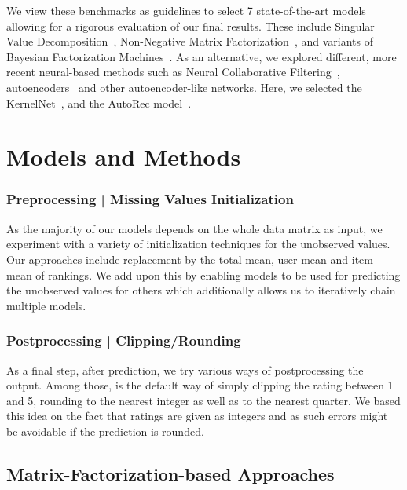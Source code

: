 \documentclass[10pt,conference,compsocconf]{IEEEtran}
\begin{document}
    We view these benchmarks as guidelines to select 7 state-of-the-art models allowing for a rigorous evaluation of our final results.
    These include Singular Value Decomposition~\cite{svd}, Non-Negative Matrix Factorization~\cite{6165290}, and variants of Bayesian Factorization Machines~\cite{freudenthaler_bayesian_2011, salakhutdinov_bayesian_2008}.
    As an alternative, we explored different, more recent neural-based methods such as Neural Collaborative Filtering~\cite{DBLP:journals/corr/abs-1708-05031}, autoencoders~\cite{inproceedings} and other autoencoder-like networks.
    Here, we selected the KernelNet~\cite{pmlr-v80-muller18a}, and the AutoRec model~\cite{inproceedings}.


    \section{Models and Methods}

    \subsubsection{Preprocessing | Missing Values Initialization}\label{subsub:missing_init}
    As the majority of our models depends on the whole data matrix as input, we experiment with a variety of initialization techniques for the unobserved values.
    Our approaches include replacement by the total mean, user mean and item mean of rankings.
    We add upon this by enabling models to be used for predicting the unobserved values for others which additionally allows us to iteratively chain multiple models.

    \subsubsection{Postprocessing | Clipping/Rounding}
    As a final step, after prediction, we try various ways of postprocessing the output.
    Among those, is the default way of simply clipping the rating between 1 and 5, rounding to the nearest integer as well as to the nearest quarter.
    We based this idea on the fact that ratings are given as integers and as such errors might be avoidable if the prediction is rounded.

    \subsection{Matrix-Factorization-based Approaches}
\end{document}

